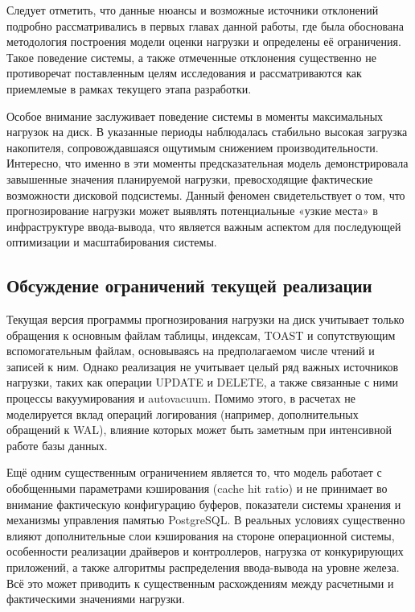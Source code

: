 Следует отметить, что данные нюансы и возможные источники отклонений подробно рассматривались в первых главах данной работы, 
где была обоснована методология построения модели оценки нагрузки и определены её ограничения. Такое поведение системы, 
а также отмеченные отклонения существенно не противоречат поставленным целям исследования и рассматриваются как приемлемые 
в рамках текущего этапа разработки.

Особое внимание заслуживает поведение системы в моменты максимальных нагрузок на диск. В указанные периоды наблюдалась стабильно 
высокая загрузка накопителя, сопровождавшаяся ощутимым снижением производительности. Интересно, что именно в эти моменты 
предсказательная модель демонстрировала завышенные значения планируемой нагрузки, превосходящие фактические возможности дисковой 
подсистемы. Данный феномен свидетельствует о том, что прогнозирование нагрузки может выявлять потенциальные «узкие места» в инфраструктуре 
ввода-вывода, что является важным аспектом для последующей оптимизации и масштабирования системы.

\subsection{Обсуждение ограничений текущей реализации}

Текущая версия программы прогнозирования нагрузки на диск учитывает только обращения к основным файлам таблицы, 
индексам, TOAST и сопутствующим вспомогательным файлам, основываясь на предполагаемом числе чтений и записей к ним. 
Однако реализация не учитывает целый ряд важных источников нагрузки, таких как операции UPDATE и DELETE, 
а также связанные с ними процессы вакуумирования и autovacuum. Помимо этого, в расчетах не моделируется вклад 
операций логирования (например, дополнительных обращений к WAL), влияние которых может быть заметным при интенсивной 
работе базы данных.

Ещё одним существенным ограничением является то, что модель работает с обобщенными параметрами кэширования 
(cache hit ratio) и не принимает во внимание фактическую конфигурацию буферов, показатели системы хранения 
и механизмы управления памятью PostgreSQL. В реальных условиях существенно влияют дополнительные слои кэширования 
на стороне операционной системы, особенности реализации драйверов и контроллеров, нагрузка от конкурирующих приложений, 
а также алгоритмы распределения ввода-вывода на уровне железа. Всё это может приводить к существенным расхождениям 
между расчетными и фактическими значениями нагрузки.

